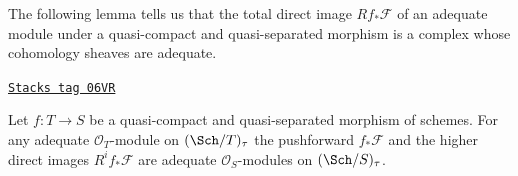 The following lemma tells us that the total direct image
$Rf_*\mathcal{F}$ of an adequate module under a quasi-compact and
quasi-separated morphism is a complex whose cohomology sheaves
are adequate.

\begin{lemma}
\label{adequate-lemma-direct-image-adequate}
\href{https://stacks.math.columbia.edu/tag/06VR}{\texttt{Stacks tag 06VR}}

Let $f : T \to S$ be a quasi-compact and quasi-separated morphism
of schemes. For any adequate $\mathcal{O}_T$-module on
$(\Sch/T)_\tau$ the pushforward
$f_*\mathcal{F}$ and the higher direct images $R^if_*\mathcal{F}$
are adequate $\mathcal{O}_S$-modules on $(\Sch/S)_\tau$.
\end{lemma}

